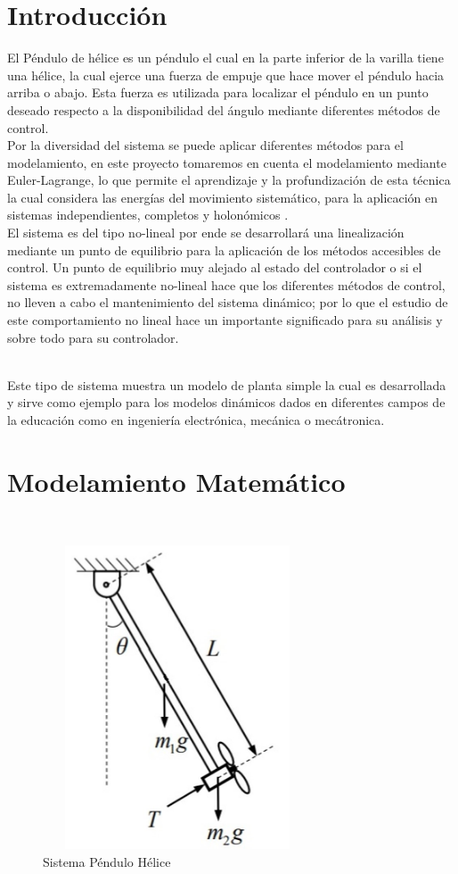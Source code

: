 \documentclass[12pt]{article}
\begin{document}
\newpage
\section{Introducción}

El Péndulo de hélice es un péndulo el cual en la parte inferior de la varilla tiene una hélice, la cual ejerce una fuerza de empuje que hace mover el péndulo hacia arriba o abajo. Esta fuerza es utilizada para localizar el péndulo en un punto deseado respecto a la disponibilidad del ángulo mediante diferentes métodos de control. 
\\
Por la diversidad del sistema se puede aplicar diferentes métodos para el modelamiento, en este proyecto tomaremos en cuenta el modelamiento mediante Euler-Lagrange, lo que permite el aprendizaje y la profundización de esta técnica la cual considera las energías del movimiento sistemático, para la aplicación en sistemas independientes, completos y holonómicos \cite{MitLagrange}.
\\
El sistema es del tipo no-lineal por ende se desarrollará una linealización mediante un punto de equilibrio para la aplicación de los métodos accesibles de control. Un punto de equilibrio muy alejado al estado del controlador o si el sistema es extremadamente no-lineal hace que los diferentes métodos de control, no lleven a cabo el mantenimiento del sistema dinámico; por lo que el estudio de este comportamiento no lineal hace un importante significado para su análisis y sobre todo para su controlador. 

\\
Este tipo de sistema muestra un modelo de planta simple la cual es desarrollada y sirve como ejemplo para los modelos dinámicos dados en diferentes campos de la educación como en ingeniería electrónica, mecánica o mecátronica.
\newpage
\section{Modelamiento Matemático}
\\

\begin{figure}[h]
    \centering
    \includegraphics[width=8cm, height=9cm]{model.jpg}
    \caption{Sistema Péndulo Hélice}
    \label{fig:model}
\end{figure}
\end{document}

